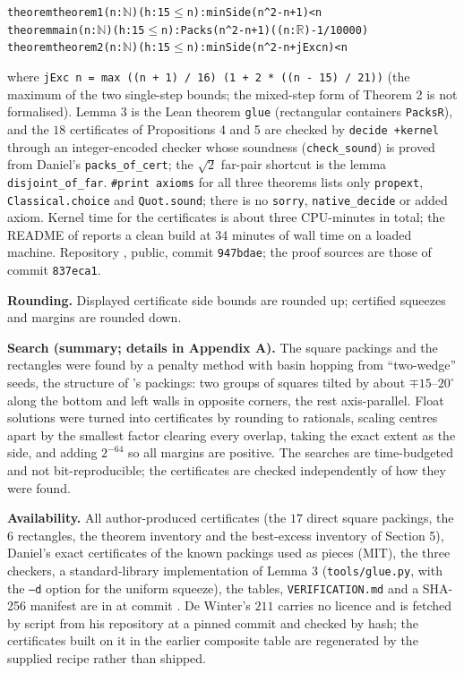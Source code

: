 \documentclass[11pt,letterpaper]{amsart}
\theoremstyle{plain}
\begin{document}
\begin{footnotesize}
\begin{alltt}
theorem theorem1 (n : \(\mathbb{N}\)) (h : 15 \(\le\) n) : minSide (n ^ 2 - n + 1) < n
theorem main     (n : \(\mathbb{N}\)) (h : 15 \(\le\) n) : Packs (n ^ 2 - n + 1) ((n : \(\mathbb{R}\)) - 1 / 10000)
theorem theorem2 (n : \(\mathbb{N}\)) (h : 15 \(\le\) n) : minSide (n ^ 2 - n + jExc n) < n
\end{alltt}
\end{footnotesize}

\noindent where \texttt{jExc n = max ((n + 1) / 16) (1 + 2 * ((n - 15) / 21))} (the maximum of the two single-step bounds; the mixed-step form of Theorem 2 is not formalised). Lemma 3 is the Lean theorem \texttt{glue} (rectangular containers \texttt{PacksR}), and the $18$ certificates of Propositions 4 and 5 are checked by \texttt{decide +kernel} through an integer-encoded checker whose soundness (\texttt{check\_sound}) is proved from Daniel's \texttt{packs\_of\_cert}; the $\sqrt 2$ far-pair shortcut is the lemma \texttt{disjoint\_of\_far}. \texttt{\#print axioms} for all three theorems lists only \texttt{propext}, \texttt{Classical.choice} and \texttt{Quot.sound}; there is no \texttt{sorry}, \texttt{native\_decide} or added axiom. Kernel time for the certificates is about three CPU-minutes in total; the README of \cite{FanL26} reports a clean build at 34 minutes of wall time on a loaded machine. Repository \cite{FanL26}, public, commit \texttt{947bdae}; the proof sources are those of commit \texttt{837eca1}.

\textbf{Rounding.} Displayed certificate side bounds are rounded up; certified squeezes and margins are rounded down.

\textbf{Search (summary; details in Appendix A).} The square packings and the rectangles were found by a penalty method with basin hopping from ``two-wedge'' seeds, the structure of \cite{AMS21}'s packings: two groups of squares tilted by about $\mp 15$--$20^\circ$ along the bottom and left walls in opposite corners, the rest axis-parallel. Float solutions were turned into certificates by rounding to rationals, scaling centres apart by the smallest factor clearing every overlap, taking the exact extent as the side, and adding $2^{-64}$ so all margins are positive. The searches are time-budgeted and not bit-reproducible; the certificates are checked independently of how they were found.

\textbf{Availability.} All author-produced certificates (the $17$ direct square packings, the $6$ rectangles, the theorem inventory and the best-excess inventory of Section 5), Daniel's exact certificates of the known packings used as pieces (MIT), the three checkers, a standard-library implementation of Lemma 3 (\texttt{tools/glue.py}, with the \texttt{--d} option for the uniform squeeze), the tables, \texttt{VERIFICATION.md} and a SHA-256 manifest are in \cite{Fan26} at commit . De Winter's $211$ carries no licence and is fetched by script from his repository at a pinned commit and checked by hash; the certificates built on it in the earlier composite table are regenerated by the supplied recipe rather than shipped.
\end{document}
